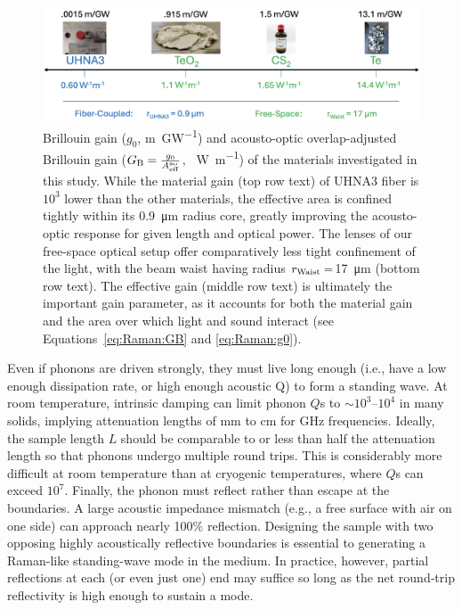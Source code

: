 \begin{figure}[t]
  \centering
  \includegraphics[width=\textwidth]{figs/4-Raman/GainofRelevantMaterials.png}
  \caption[Brillouin gain of investigated materials.]{Brillouin gain (\(g_{0}\), \si{\meter\per\giga\watt}) and acousto-optic overlap-adjusted Brillouin gain (\(G_{\rm B} = \frac{g_{0}}{A_{\rm eff}^{\rm ao}}\), \si{\per\watt\per\meter}) of the materials investigated in this study. While the material gain (top row text) of \ac{UHNA3} fiber is \(10^{3}\) lower than the other materials, the effective area is confined tightly within its \SI{0.9}{\micro\meter} radius core, greatly improving the acousto-optic response for given length and optical power. The lenses of our free-space optical setup offer comparatively less tight confinement of the light, with the beam waist having radius \(r_{\rm Waist}=\)\SI{17}{\micro\meter} (bottom row text). The effective gain (middle row text) is ultimately the important gain parameter, as it accounts for both the material gain and the area over which light and sound interact (see Equations~\ref{eq:Raman:GB} and \ref{eq:Raman:g0}). \cite{boyd2020nonlinear, dubinskii2004teo2, johnson2023laser, behunin2015long, enright1974depolarized, coakley1975brillouin, renninger2018bulk, uchida1969elastic, schweppe1970elastic, ohmachi1972acoustic, peercy1975temperature, fleury2018non, harris1991multichannel, uchida1971optical}}
  \label{fig:Raman:GainofRelevantMaterials}
\end{figure}

Even if phonons are driven strongly, they must live long enough (i.e., have a low enough dissipation rate, or high enough acoustic Q) to form a standing wave. At room temperature, intrinsic damping can limit phonon \(Q\)s to \(\sim\)\(10^{3}\)–\(10^{4}\) in many solids, \cite{heiman1979brillouin, bucaro1974high} implying attenuation lengths of \si{\milli\meter} to \si{\centi\meter} for \si{\giga\hertz} frequencies. Ideally, the sample length \(L\) should be comparable to or less than half the attenuation length so that phonons undergo multiple round trips. This is considerably more difficult at room temperature than at cryogenic temperatures, where \(Q\)s can exceed \(10^{7}\). \cite{maris1990phonon, renninger2018bulk} Finally, the phonon must reflect rather than escape at the boundaries. A large acoustic impedance mismatch (e.g., a free surface with air on one side) can approach nearly 100\% reflection. \cite{galliou2013extremely, auld1973acoustic} Designing the sample with two opposing highly acoustically reflective boundaries is essential to generating a Raman-like standing-wave mode in the medium. In practice, however, partial reflections at each (or even just one) end may suffice so long as the net round‐trip reflectivity is high enough to sustain a mode.


